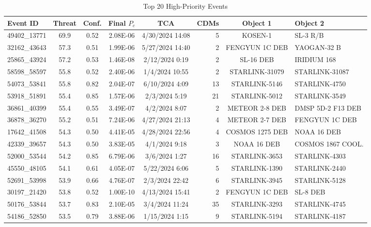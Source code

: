 \documentclass[12pt, a4paper]{article}
\begin{document}
\begin{table}[H]
\caption{Top 20 High-Priority Events}
\label{tab:top20}
\centering
\setlength{\tabcolsep}{4pt}
\small
\begin{tabular}{lccccrcl}
\toprule
\textbf{Event ID} & \textbf{Threat} & \textbf{Conf.} & \textbf{Final $P_c$} & \textbf{TCA} & \textbf{CDMs} & \textbf{Object 1} & \textbf{Object 2} \\
\midrule
49402\_13771 & 69.9 & 0.52 & 2.08E-06 & 4/30/2024 14:08 &  5 & KOSEN-1          & SL-3 R/B           \\
32162\_43643 & 57.3 & 0.51 & 1.99E-06 & 5/27/2024 14:40 &  2 & FENGYUN 1C DEB   & YAOGAN-32 B        \\
25865\_43924 & 57.2 & 0.53 & 1.46E-08 & 2/12/2024  0:19 &  2 & SL-16 DEB        & IRIDIUM 168        \\
58598\_58597 & 55.8 & 0.52 & 2.40E-06 & 1/4/2024  10:55 &  2 & STARLINK-31079   & STARLINK-31087     \\
54073\_53841 & 55.8 & 0.82 & 2.04E-07 & 6/10/2024  4:09 & 13 & STARLINK-5146    & STARLINK-4750      \\
53918\_51891 & 55.4 & 0.85 & 1.57E-06 & 2/3/2024   5:19 & 21 & STARLINK-5012    & STARLINK-3549      \\
36861\_40399 & 55.4 & 0.55 & 3.49E-07 & 4/2/2024   8:07 &  2 & METEOR 2-8 DEB   & DMSP 5D-2 F13 DEB  \\
36878\_36270 & 55.2 & 0.51 & 7.24E-06 & 4/27/2024 21:13 &  4 & METEOR 2-7 DEB   & FENGYUN 1C DEB     \\
17642\_41508 & 54.3 & 0.50 & 4.41E-05 & 4/28/2024 22:56 &  4 & COSMOS 1275 DEB  & NOAA 16 DEB        \\
42339\_39657 & 54.3 & 0.50 & 3.83E-05 & 4/1/2024   9:18 &  3 & NOAA 16 DEB      & COSMOS 1867 COOL.  \\
52000\_53544 & 54.2 & 0.85 & 6.79E-06 & 3/6/2024   1:27 & 16 & STARLINK-3653    & STARLINK-4303      \\
45550\_48105 & 54.1 & 0.61 & 4.05E-07 & 5/22/2024  6:06 &  5 & STARLINK-1390    & STARLINK-2440      \\
52691\_53998 & 53.9 & 0.66 & 4.76E-07 & 2/3/2024  22:42 &  6 & STARLINK-3945    & STARLINK-5128      \\
30197\_21420 & 53.8 & 0.52 & 1.00E-10 & 4/13/2024 15:41 &  2 & FENGYUN 1C DEB   & SL-8 DEB           \\
50176\_53844 & 53.7 & 0.83 & 2.10E-05 & 3/4/2024  11:24 & 35 & STARLINK-3293    & STARLINK-4745      \\
54186\_52850 & 53.5 & 0.79 & 3.88E-06 & 1/15/2024  1:15 &  9 & STARLINK-5194    & STARLINK-4187      \\

\end{tabular}
\end{table}
\end{document}
